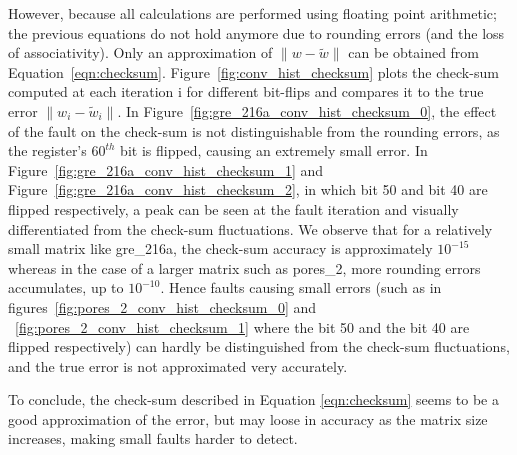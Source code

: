 \documentclass[twoside]{article}
\newcounter{fig}\setcounter{fig}{0}
\begin{document}
  However, because all calculations are performed using floating point arithmetic; the previous equations do not hold anymore due to rounding errors (and the loss of associativity).
  Only an approximation of $\|w - \widetilde{w} \|$ can be obtained from Equation~\eqref{eqn:checksum}.
  Figure~\ref{fig:conv_hist_checksum} plots the check-sum computed at each iteration i for different bit-flips and compares it to the true error $\|w_i - \widetilde{w}_i \|$. In Figure~\ref{fig:gre_216a_conv_hist_checksum_0}, the effect of the fault on the check-sum is not distinguishable from the rounding errors, as the register's $60^{th}$ bit is flipped, causing an extremely small error. In Figure~\ref{fig:gre_216a_conv_hist_checksum_1} and Figure~\ref{fig:gre_216a_conv_hist_checksum_2}, in which bit 50 and bit 40 are flipped respectively, a peak can be seen at the fault iteration and visually differentiated from the check-sum fluctuations. We observe that for a relatively small matrix like gre_216a, the check-sum accuracy is approximately $10^{-15}$ whereas in the case of a larger matrix such as pores_2, more rounding errors accumulates, up to $10^{-10}$. Hence faults causing small errors (such as in figures~\ref{fig:pores_2_conv_hist_checksum_0} and ~\ref{fig:pores_2_conv_hist_checksum_1} where the bit 50 and the bit 40 are flipped respectively) can hardly be distinguished from the check-sum fluctuations, and the true error is not approximated very accurately.

  To conclude, the check-sum described in Equation \eqref{eqn:checksum} seems to be a good approximation of the error, but may loose in accuracy as the matrix size increases, making small faults harder to detect.
\end{document}
